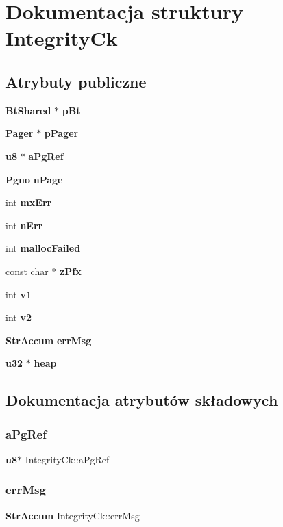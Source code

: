 \section{Dokumentacja struktury Integrity\+Ck}
\label{struct_integrity_ck}
\subsection*{Atrybuty publiczne}
\begin{DoxyCompactItemize}
\item 
\textbf{ Bt\+Shared} $\ast$ \textbf{ p\+Bt}
\item 
\textbf{ Pager} $\ast$ \textbf{ p\+Pager}
\item 
\textbf{ u8} $\ast$ \textbf{ a\+Pg\+Ref}
\item 
\textbf{ Pgno} \textbf{ n\+Page}
\item 
int \textbf{ mx\+Err}
\item 
int \textbf{ n\+Err}
\item 
int \textbf{ malloc\+Failed}
\item 
const char $\ast$ \textbf{ z\+Pfx}
\item 
int \textbf{ v1}
\item 
int \textbf{ v2}
\item 
\textbf{ Str\+Accum} \textbf{ err\+Msg}
\item 
\textbf{ u32} $\ast$ \textbf{ heap}
\end{DoxyCompactItemize}


\subsection{Dokumentacja atrybutów składowych}
\mbox{\label{struct_integrity_ck_a317f80aef5842ad69df75b55e14118d1}} 
\subsubsection{aPgRef}
{\footnotesize\ttfamily \textbf{ u8}$\ast$ Integrity\+Ck\+::a\+Pg\+Ref}

\mbox{\label{struct_integrity_ck_a1e9b79bb1d7b22a840001333200a950e}} 
\subsubsection{errMsg}
{\footnotesize\ttfamily \textbf{ Str\+Accum} Integrity\+Ck\+::err\+Msg}

